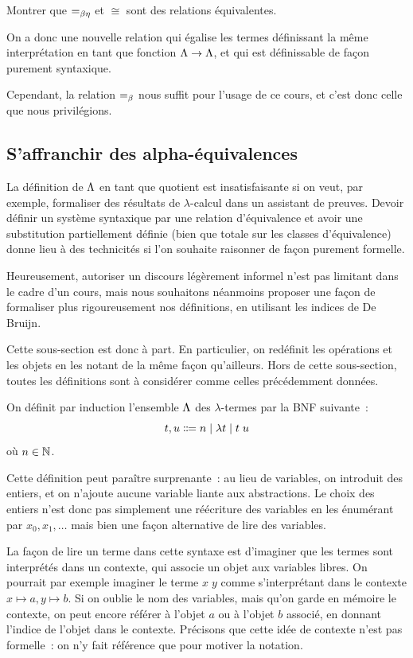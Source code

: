 \begin{exercise}
  Montrer que $=_{\beta\eta}$ et $\cong$ sont des relations équivalentes.
\end{exercise}

On a donc une nouvelle relation qui égalise les termes définissant la même
interprétation en tant que fonction $\Lambda \to \Lambda$, et qui est
définissable de façon purement syntaxique.

Cependant, la relation $=_{\beta}$ nous suffit pour l'usage de ce cours, et c'est
donc celle que nous privilégions.

\subsection{S'affranchir des alpha-équivalences}

La définition de $\Lambda$ en tant que quotient est insatisfaisante si on veut,
par exemple, formaliser des résultats de $\lambda$-calcul dans un assistant de
preuves. Devoir définir un système syntaxique par une relation d'équivalence et
avoir une substitution partiellement définie (bien que totale sur les classes
d'équivalence) donne lieu à des technicités si l'on souhaite raisonner de façon
purement formelle.

Heureusement, autoriser un discours légèrement informel n'est pas limitant dans
le cadre d'un cours, mais nous souhaitons néanmoins proposer une façon de
formaliser plus rigoureusement nos définitions, en utilisant les indices de
De Bruijn.

Cette sous-section est donc à part. En particulier, on redéfinit les opérations
et les objets en les notant de la même façon qu'ailleurs. Hors de cette
sous-section, toutes les définitions sont à considérer comme celles précédemment
données.

\begin{definition}
  On définit par induction l'ensemble $\Lambda$ des $\lambda$-termes par
  la BNF suivante~:
  \[t,u\inddefeq n\mid \lambda t\mid t\;u\]
  où $n \in \mathbb N$.
\end{definition}

Cette définition peut paraître surprenante~: au lieu de variables, on introduit
des entiers, et on n'ajoute aucune variable liante aux abstractions. Le choix
des entiers n'est donc pas simplement une réécriture des variables en les
énumérant par $x_0,x_1,\ldots$ mais bien une façon alternative de lire des
variables.

La façon de lire un terme dans cette syntaxe est d'imaginer que les termes sont
interprétés dans un contexte, qui associe un objet aux variables libres. On
pourrait par exemple imaginer le terme $x\;y$ comme s'interprétant dans le
contexte $x \mapsto a, y \mapsto b$. Si on oublie le nom des variables, mais
qu'on garde en mémoire le contexte, on peut encore référer à l'objet $a$ ou à
l'objet $b$ associé, en donnant l'indice de l'objet dans le contexte.
Précisons que cette idée de contexte n'est pas formelle~: on n'y fait référence
que pour motiver la notation.

